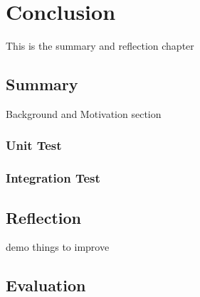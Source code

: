 \chapter{Conclusion}

This is the summary and reflection chapter 

\section{Summary}
Background and Motivation section
\subsection{Unit Test}
\subsection{Integration Test}

\section{Reflection}
demo
things to improve

\section{Evaluation}